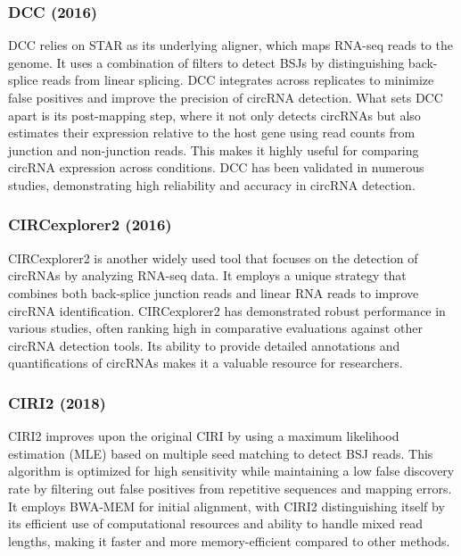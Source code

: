 \subsubsection{DCC (2016)\supercite{cheng_specific_2016}}
DCC relies on STAR as its underlying aligner, which maps RNA-seq reads to the
genome.
It uses a combination of filters to detect BSJs by distinguishing back-splice
reads from linear splicing.
DCC integrates across replicates to minimize false positives and improve the
precision of circRNA detection.
What sets DCC apart is its post-mapping step, where it not only detects
circRNAs but also estimates their expression relative to the host gene using
read counts from junction and non-junction reads.
This makes it highly useful for comparing circRNA expression across
conditions\supercite{cheng_specific_2016}.
DCC has been validated in numerous studies, demonstrating high reliability and
accuracy in circRNA detection\supercite{paraboschi_interpreting_2018}.

\subsubsection{CIRCexplorer2 (2016)\supercite{zhang_diverse_2016}}
CIRCexplorer2 is another widely used tool that focuses on the detection of
circRNAs by analyzing RNA-seq data.
It employs a unique strategy that combines both back-splice junction reads and
linear RNA reads to improve circRNA identification.
CIRCexplorer2 has demonstrated robust performance in various studies, often
ranking high in comparative evaluations against other circRNA detection
tools\supercite{zeng_comprehensive_2017,nicolet_circular_2018}.
Its ability to provide detailed annotations and quantifications of circRNAs
makes it a valuable resource for researchers\supercite{hansen_comparison_2016}.

\subsubsection{CIRI2 (2018)\supercite{gao_circular_2018}}
CIRI2 improves upon the original CIRI\supercite{gao_ciri_2015} by using a
maximum likelihood estimation (MLE) based on multiple seed matching to detect
BSJ reads.
This algorithm is optimized for high sensitivity while maintaining a low false
discovery rate by filtering out false positives from repetitive sequences and
mapping errors.
It employs BWA-MEM for initial alignment, with CIRI2 distinguishing itself by
its efficient use of computational resources and ability to handle mixed read
lengths, making it faster and more memory-efficient compared to other
methods\supercite{gao_circular_2018}.
